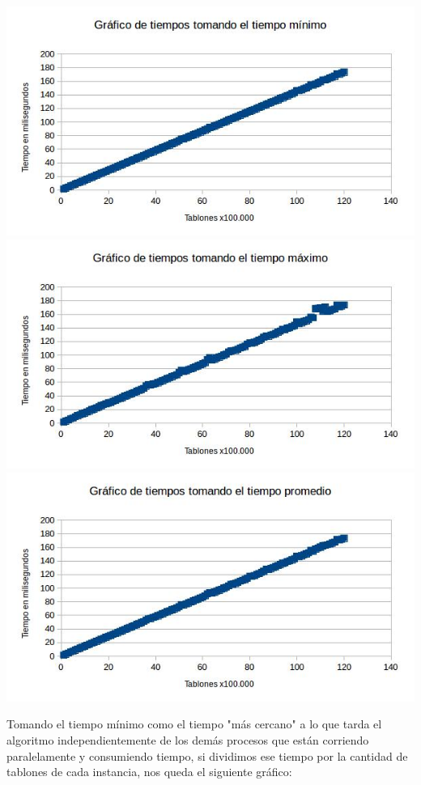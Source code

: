 \documentclass{article}
\begin{document}
\includegraphics[width=\textwidth,height=\textheight,keepaspectratio
]{puentetiempominimoS.jpg}
\vspace{0.5cm}
\includegraphics[width=\textwidth,height=\textheight,keepaspectratio
]{puentetiempomaximoS.jpg}
\includegraphics[width=\textwidth,height=\textheight,keepaspectratio
]{puentetiempopromedioS.jpg}

\newpage Tomando el tiempo m\'inimo como el tiempo "m\'as cercano" a lo que tarda el algoritmo independientemente de los dem\'as procesos que est\'an corriendo paralelamente y consumiendo tiempo, si dividimos ese tiempo por la cantidad de tablones de cada instancia, nos queda el siguiente gr\'afico:
\end{document}
